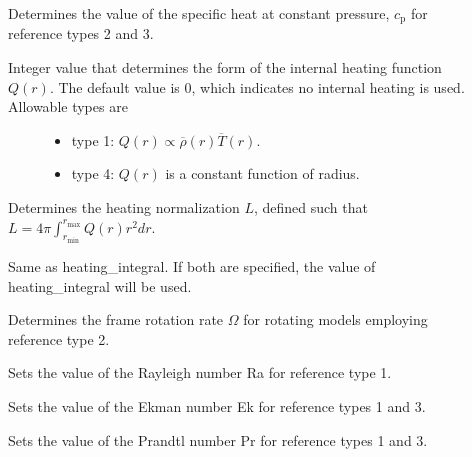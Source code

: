 \documentclass[letterpaper,11pt,english]{sphinxmanual}
\begin{document}
\begin{description}
\item[{}] \leavevmode
\sphinxAtStartPar
Determines the value of the specific heat at constant pressure, \(c_\mathrm{p}\) for reference types 2 and 3.

\item[{}] \leavevmode\begin{description}
\item[{Integer value that determines the form of the internal heating function \(Q(r)\).  The default value is 0, which indicates no internal heating is used.  Allowable types are}] \leavevmode\begin{itemize}
\item {} 
\sphinxAtStartPar
type 1: \(Q(r)\propto\overline{\rho}(r)\overline{T}(r)\).

\item {} 
\sphinxAtStartPar
type 4: \(Q(r)\) is a constant function of radius.

\end{itemize}

\end{description}

\item[{}] \leavevmode
\sphinxAtStartPar
Determines the heating normalization \(L\), defined such that \(L=4\pi\int_{r_\mathrm{min}}^{r_\mathrm{max}} Q(r) r^2 dr\).

\item[{}] \leavevmode
\sphinxAtStartPar
Same as heating\_integral.  If both are specified, the value of heating\_integral will be used.

\item[{}] \leavevmode
\sphinxAtStartPar
Determines the frame rotation rate \(\Omega\) for rotating models employing reference type 2.

\item[{}] \leavevmode
\sphinxAtStartPar
Sets the value of the Rayleigh number Ra for reference type 1.

\item[{}] \leavevmode
\sphinxAtStartPar
Sets the value of the Ekman number Ek for reference types 1 and 3.

\item[{}] \leavevmode
\sphinxAtStartPar
Sets the value of the Prandtl number Pr for reference types 1 and 3.


\end{description}
\end{document}
